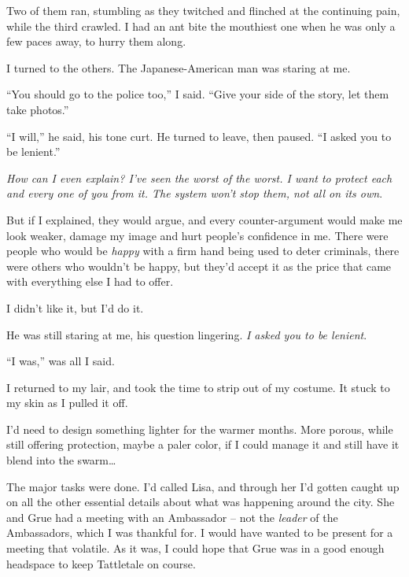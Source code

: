Two of them ran, stumbling as they twitched and flinched at the continuing pain, while the third crawled.  I had an ant bite the mouthiest one when he was only a few paces away, to hurry them along.



I turned to the others.  The Japanese-American man was staring at me.



``You should go to the police too,'' I said.  ``Give your side of the story, let them take photos.''



``I will,'' he said, his tone curt.  He turned to leave, then paused.  ``I asked you to be lenient.''



\emph{How can I even explain?  I've seen the worst of the worst.  I want to protect each and every one of you from it.  The system won't stop them, not all on its own}.



But if I explained, they would argue, and every counter-argument would make me look weaker, damage my image and hurt people's confidence in me.  There were people who would be \emph{happy} with a firm hand being used to deter criminals, there were others who wouldn't be happy, but they'd accept it as the price that came with everything else I had to offer.



I didn't like it, but I'd do it.



He was still staring at me, his question lingering.  \emph{I asked you to be lenient}.



``I was,'' was all I said.



\blacksquare



I returned to my lair, and took the time to strip out of my costume.  It stuck to my skin as I pulled it off.



I'd need to design something lighter for the warmer months.  More porous, while still offering protection, maybe a paler color, if I could manage it and still have it blend into the swarm\ldots



The major tasks were done.  I'd called Lisa, and through her I'd gotten caught up on all the other essential details about what was happening around the city.  She and Grue had a meeting with an Ambassador – not the \emph{leader} of the Ambassadors, which I was thankful for.  I would have wanted to be present for a meeting that volatile.  As it was, I could hope that Grue was in a good enough headspace to keep Tattletale on course.



